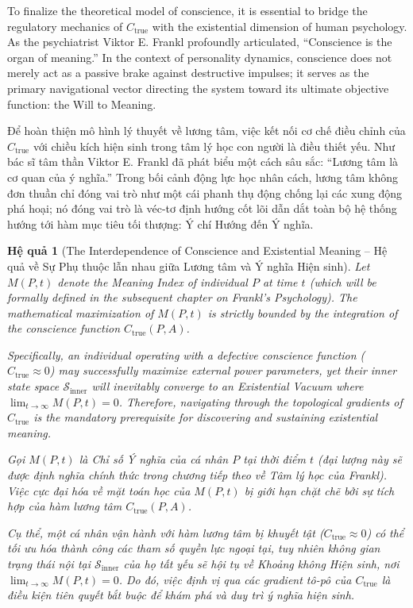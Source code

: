 \documentclass{report}
\newtheorem{hequa}{Hệ quả}
\begin{document}
To finalize the theoretical model of conscience, it is essential to bridge the regulatory mechanics of $C_{\text{true}}$ with the existential dimension of human psychology. As the psychiatrist Viktor E. Frankl profoundly articulated, ``Conscience is the organ of meaning.'' In the context of personality dynamics, conscience does not merely act as a passive brake against destructive impulses; it serves as the primary navigational vector directing the system toward its ultimate objective function: the Will to Meaning.

Để hoàn thiện mô hình lý thuyết về lương tâm, việc kết nối cơ chế điều chỉnh của $C_{\text{true}}$ với chiều kích hiện sinh trong tâm lý học con người là điều thiết yếu. Như bác sĩ tâm thần Viktor E. Frankl đã phát biểu một cách sâu sắc: ``Lương tâm là cơ quan của ý nghĩa.'' Trong bối cảnh động lực học nhân cách, lương tâm không đơn thuần chỉ đóng vai trò như một cái phanh thụ động chống lại các xung động phá hoại; nó đóng vai trò là véc-tơ định hướng cốt lõi dẫn dắt toàn bộ hệ thống hướng tới hàm mục tiêu tối thượng: Ý chí Hướng đến Ý nghĩa.

\begin{hequa}[The Interdependence of Conscience and Existential Meaning -- Hệ quả về Sự Phụ thuộc lẫn nhau giữa Lương tâm và Ý nghĩa Hiện sinh]
	Let $M(P, t)$ denote the Meaning Index of individual $P$ at time $t$ (which will be formally defined in the subsequent chapter on Frankl's Psychology). The mathematical maximization of $M(P, t)$ is strictly bounded by the integration of the conscience function $C_{\text{true}}(P, A)$. 
	
	Specifically, an individual operating with a defective conscience function ($C_{\text{true}} \approx 0$) may successfully maximize external power parameters, yet their inner state space $\mathcal{S}_{\text{inner}}$ will inevitably converge to an Existential Vacuum where $\lim_{t \to \infty} M(P, t) = 0$. Therefore, navigating through the topological gradients of $C_{\text{true}}$ is the mandatory prerequisite for discovering and sustaining existential meaning.
	
	Gọi $M(P, t)$ là Chỉ số Ý nghĩa của cá nhân $P$ tại thời điểm $t$ (đại lượng này sẽ được định nghĩa chính thức trong chương tiếp theo về Tâm lý học của Frankl). Việc cực đại hóa về mặt toán học của $M(P, t)$ bị giới hạn chặt chẽ bởi sự tích hợp của hàm lương tâm $C_{\text{true}}(P, A)$.
	
	Cụ thể, một cá nhân vận hành với hàm lương tâm bị khuyết tật ($C_{\text{true}} \approx 0$) có thể tối ưu hóa thành công các tham số quyền lực ngoại tại, tuy nhiên không gian trạng thái nội tại $\mathcal{S}_{\text{inner}}$ của họ tất yếu sẽ hội tụ về Khoảng không Hiện sinh, nơi $\lim_{t \to \infty} M(P, t) = 0$. Do đó, việc định vị qua các gradient tô-pô của $C_{\text{true}}$ là điều kiện tiên quyết bắt buộc để khám phá và duy trì ý nghĩa hiện sinh.
\end{hequa}
\end{document}
